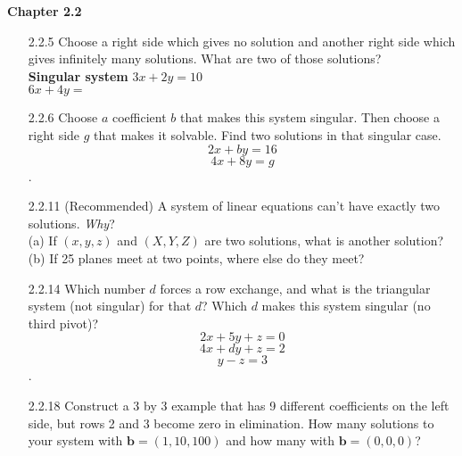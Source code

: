 \documentclass[10pt,twoside,reqno]{article}
\begin{document}
\vspace{3mm}
\vspace{5mm}
\textbf{Chapter 2.2}
\begin{enumerate}
\item[2.2.5]Choose a right side which gives no solution and another right side which gives infinitely many solutions. What are two of those solutions? \\
\vspace{3mm}
\hspace{100pt}
\textbf{Singular system}
\hspace{45pt}
$3x + 2y = 10$\\
\hspace{232pt}
$6x + 4y =$\\
\vspace{3mm}
\item[2.2.6]Choose $a$ coefficient $b$ that makes this system singular. Then choose a right side $g$ that makes it solvable. Find two solutions in that singular case. \\
$$2x + by = 16$$ $$4x + 8y = g$$.
\item[2.2.11](Recommended) A system of linear equations can't have exactly two solutions. \textit{Why}? \\
\vspace{3mm}
\hspace{10pt}(a) If $(x, y, z)$ and $(X, Y, Z)$ are two solutions, what is another solution?\\
\vspace{3mm}
\hspace{10pt}(b) If 25 planes meet at two points, where else do they meet? 
\vspace{3mm}
\item[2.2.14]Which number $d$ forces a row exchange, and what is the triangular system (not singular) for that $d$? Which $d$ makes this system singular (no third pivot)?
$$2x + 5y + z = 0$$ $$4x + dy + z = 2$$ $$y -z = 3$$. 
\item[2.2.18]Construct a 3 by 3 example that has 9 different coefficients on the left side, but rows 2 and 3 become zero in elimination. How many solutions to your system with $\pmb{b} = (1,10,100)$ and how many with $\pmb{b} = (0,0,0)$? 

\end{enumerate}
\end{document}
